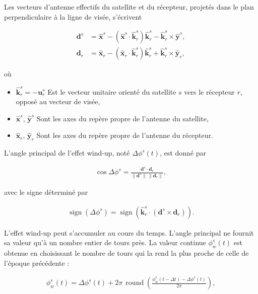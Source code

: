 Les vecteurs d'antenne effectifs du satellite et du récepteur, projetés dans le plan perpendiculaire à la ligne de visée, s'écrivent

\begin{align}
\mathbf d^s
&=
\hat{\mathbf x}^s
-(\hat{\mathbf x}^s\cdot\hat{\mathbf k}_r^s)\hat{\mathbf k}_r^s
-\hat{\mathbf k}_r^s\times\hat{\mathbf y}^s,
\\
\mathbf d_r
&=
\hat{\mathbf x}_r
-(\hat{\mathbf x}_r\cdot\hat{\mathbf k}_r^s)\hat{\mathbf k}_r^s
+\hat{\mathbf k}_r^s\times\hat{\mathbf y}_r,
\end{align}

où

\begin{itemize}
    \item $\hat{\mathbf k}_r^s=-\mathbf u_r^s$ Est le vecteur unitaire
    orienté du satellite $s$ vers le récepteur $r$, opposé au vecteur de visée,
    \item $\hat{\mathbf x}^s$, $\hat{\mathbf y}^s$ Sont les axes du repère propre de l'antenne du satellite,
    \item $\hat{\mathbf x}_r$, $\hat{\mathbf y}_r$ Sont les axes du repère propre de l'antenne du récepteur.
\end{itemize}

L'angle principal de l'effet wind-up, noté $\Delta\phi^s(t)$, est donné par

\begin{align}
\cos\Delta\phi^s
=
\frac{\mathbf d^s\cdot\mathbf d_r}
{\|\mathbf d^s\|\,\|\mathbf d_r\|},
\end{align}

avec le signe déterminé par

\begin{align}
\operatorname{sign}(\Delta\phi^s)
=
\operatorname{sign}\!\left(
\hat{\mathbf k}_r^s\cdot(\mathbf d^s\times\mathbf d_r)
\right).
\end{align}

L'effet wind-up peut s'accumuler au cours du temps. L'angle principal ne
fournit sa valeur qu'à un nombre entier de tours près. La valeur continue
$\phi_w^s(t)$ est obtenue en choisissant le nombre de tours qui la rend la
plus proche de celle de l'époque précédente :

\begin{align}
\phi_w^s(t)
=
\Delta\phi^s(t)
+2\pi\,\operatorname{round}\!\left(
\frac{\phi_w^s(t-\Delta t)-\Delta\phi^s(t)}{2\pi}
\right),
\end{align}


